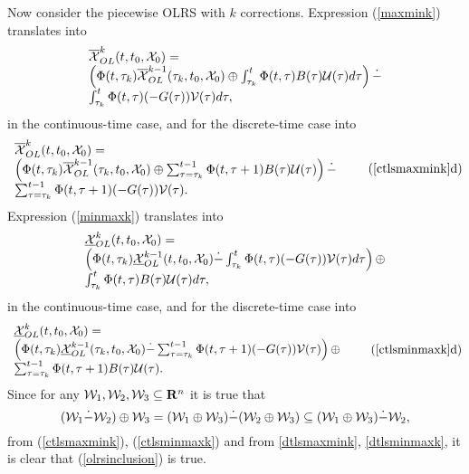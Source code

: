 Now consider the piecewise OLRS with $k$ corrections.
Expression (\ref{maxmink}) translates into
\begin{equation}
\begin{array}{l}
\OXOL^k(t, t_0, \XX_0) = \\
\left(\Phi(t, \tau_k)\OXOL^{k-1}(\tau_k, t_0, \XX_0) \oplus
\int_{\tau_k}^t\Phi(t, \tau)B(\tau)\UU(\tau)d\tau\right) \dot{-} \\
\int_{\tau_k}^t\Phi(t, \tau)(-G(\tau))\VV(\tau)d\tau,
\end{array}
\label{ctlsmaxmink}
\end{equation}
in the continuous-time case, and for the discrete-time case into
\begin{equation}
\begin{array}{l}
\OXOL^k(t, t_0, \XX_0) = \\
\left(\Phi(t, \tau_k)\OXOL^{k-1}(\tau_k, t_0, \XX_0) \oplus
\sum_{\tau=\tau_k}^{t-1}\Phi(t, \tau+1)B(\tau)\UU(\tau)\right) \dot{-} \\
\sum_{\tau=\tau_k}^{t-1}\Phi(t, \tau+1)(-G(\tau))\VV(\tau).
\end{array}
\tag*{(\ref{ctlsmaxmink}d)}
\label{dtlsmaxmink}
\end{equation}
Expression (\ref{minmaxk}) translates into
\begin{equation}
\begin{array}{l}
\UXOL^k(t, t_0, \XX_0) = \\
\left(\Phi(t, \tau_k)\UXOL^{k-1}(t, t_0, \XX_0) \dot{-}
\int_{\tau_k}^t\Phi(t, \tau)(-G(\tau))\VV(\tau)d\tau\right)
\oplus \\
\int_{\tau_k}^t\Phi(t, \tau)B(\tau)\UU(\tau)d\tau,
\end{array}
\label{ctlsminmaxk}
\end{equation}
in the continuous-time case, and for the discrete-time case into
\begin{equation}
\begin{array}{l}
\UXOL^k(t, t_0, \XX_0) = \\
\left(\Phi(t, \tau_k)\UXOL^{k-1}(\tau_k, t_0, \XX_0) \dot{-}
\sum_{\tau=\tau_k}^{t-1}\Phi(t, \tau+1)(-G(\tau))\VV(\tau)\right)
\oplus \\
\sum_{\tau=\tau_k}^{t-1}\Phi(t, \tau+1)B(\tau)\UU(\tau).
\end{array}
\tag*{(\ref{ctlsminmaxk}d)}
\label{dtlsminmaxk}
\end{equation}
Since for any $\WW_1, \WW_2, \WW_3 \subseteq {\bf R}^n$ it is true that
\[ (\WW_1 \dot{-} \WW_2) \oplus \WW_3 =
(\WW_1 \oplus \WW_3) \dot{-} (\WW_2 \oplus \WW_3) \subseteq
(\WW_1 \oplus \WW_3) \dot{-} \WW_2, \]
from (\ref{ctlsmaxmink}), (\ref{ctlsminmaxk})  and from
\ref{dtlsmaxmink}, \ref{dtlsminmaxk}, it is clear that (\ref{olrsinclusion})
is true.

